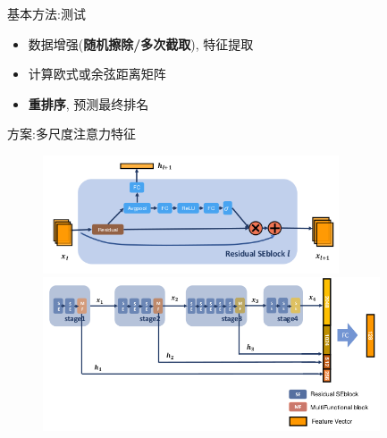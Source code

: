\documentclass[notes]{beamer}
\begin{document}
\begin{frame}
	{基本方法:测试} 
	\begin{itemize}
		\item 数据增强({\bf 随机擦除/多次截取}), 特征提取
		\item 计算欧式或余弦距离矩阵
		\item {\bf 重排序}\cite{zhong2017reranking}, 预测最终排名
	\end{itemize}
\end{frame}


\begin{frame}
	{方案:多尺度注意力特征}
	\begin{figure}
		\centering
		\includegraphics[width=0.78\textwidth]{2018-03-12-11-10-16.png} \\ 
		\includegraphics[width=0.89\textwidth]{2018-03-12-11-10-04.png} 
	\end{figure}
\end{frame}
\end{document}
